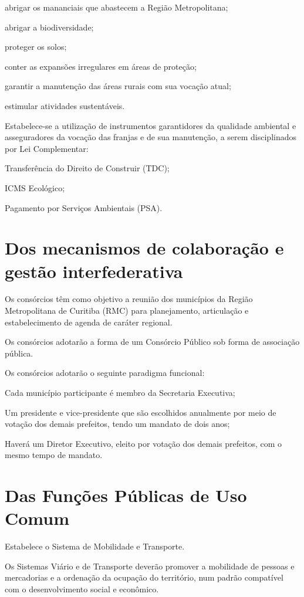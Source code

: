 \documentclass[capitulo]{br-lex-2017}
\begin{document}
		\inciso abrigar os mananciais que abastecem a Região Metropolitana;
		
		\inciso abrigar a biodiversidade;
		
		\inciso proteger os solos;
		
		\inciso conter as expansões irregulares em áreas de proteção;
		
		\inciso garantir a manutenção das áreas rurais com sua vocação atual;
		
		\inciso estimular atividades sustentáveis.

\artigo Estabelece-se a utilização de instrumentos garantidores da qualidade ambiental e asseguradores da vocação das franjas e de sua manutenção, a serem disciplinados por Lei Complementar:

\inciso Transferência do Direito de Construir (TDC);

\inciso ICMS Ecológico;

\inciso Pagamento por Serviços Ambientais (PSA).

\chapter{Dos mecanismos de colaboração e gestão interfederativa}

\artigo Os consórcios têm como objetivo a reunião dos municípios da Região Metropolitana de Curitiba (RMC) para planejamento, articulação e estabelecimento de agenda de caráter regional.

\paragrafo Os consórcios adotarão a forma de um Consórcio Público sob forma de associação pública.

\paragrafo Os consórcios adotarão o seguinte paradigma funcional:

\inciso Cada município participante é membro da Secretaria Executiva;

\inciso Um presidente e vice-presidente que são escolhidos anualmente por meio de votação dos demais prefeitos, tendo um mandato de dois anos;

\inciso Haverá um Diretor Executivo, eleito por votação dos demais prefeitos, com o mesmo tempo de mandato.

\chapter{Das Funções Públicas de Uso Comum}

\artigo Estabelece o Sistema de Mobilidade e Transporte.

\paragrafo Os Sistemas Viário e de Transporte deverão promover a mobilidade de pessoas e mercadorias e a ordenação da ocupação do território, num padrão compatível com o desenvolvimento social e econômico.
\end{document}

